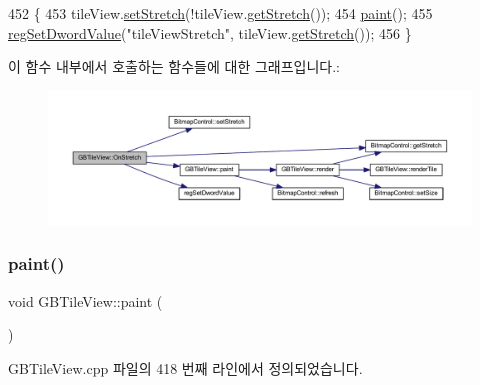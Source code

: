 \begin{DoxyCode}
452 \{
453   tileView.\mbox{\hyperlink{class_bitmap_control_ab545e15ea3edda9f0d80c0b8b0b7c812}{setStretch}}(!tileView.\mbox{\hyperlink{class_bitmap_control_a1d3cff9a3b57dd7558d678177dcf4b5c}{getStretch}}());
454   \mbox{\hyperlink{class_g_b_tile_view_aa78a471956e777509644a0a04bab2c4d}{paint}}();
455   \mbox{\hyperlink{_reg_8cpp_a758e775489a3fb5c3cc7071fdd5af87e}{regSetDwordValue}}(\textcolor{stringliteral}{"tileViewStretch"}, tileView.\mbox{\hyperlink{class_bitmap_control_a1d3cff9a3b57dd7558d678177dcf4b5c}{getStretch}}());  
456 \}
\end{DoxyCode}
이 함수 내부에서 호출하는 함수들에 대한 그래프입니다.\+:
\nopagebreak
\begin{figure}[H]
\begin{center}
\leavevmode
\includegraphics[width=350pt]{class_g_b_tile_view_a7386c9ed9651610461d4342ebd492bf9_cgraph}
\end{center}
\end{figure}
\mbox{\label{class_g_b_tile_view_aa78a471956e777509644a0a04bab2c4d}} 
\subsubsection{\texorpdfstring{paint()}{paint()}}
{\footnotesize\ttfamily void G\+B\+Tile\+View\+::paint (\begin{DoxyParamCaption}{ }\end{DoxyParamCaption})}



G\+B\+Tile\+View.\+cpp 파일의 418 번째 라인에서 정의되었습니다.


